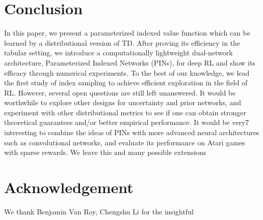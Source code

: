 \documentclass[letterpaper]{article} %
\theoremstyle{definition}
\begin{document}
\vspace{-0.95mm}
\vspace{-1.65mm}
\section{Conclusion}

In this paper, we present a parameterized indexed value function which can be learned by a distributional version of TD. After proving its efficiency in the tabular setting, we introduce a computationally lightweight dual-network architecture, Parameterized Indexed Networks (PINs), for deep RL and show its efficacy through numerical experiments. To the best of our knowledge, we lead the first study of index sampling to achieve efficient exploration in the field of RL.  However, several open questions are still left unanswered. It would be worthwhile to explore other designs for uncertainty and prior networks, and experiment with other distributional metrics to see if one can obtain stronger theoretical guarantees and/or better empirical performance. It would be very7 interesting to combine the ideas of PINs with more advanced neural architectures such as convolutional networks, and evaluate its performance on Atari games with sparse rewards. We leave this and many possible extensions

\vspace{-1.62mm}
\section{Acknowledgement}
We thank Benjamin Van Roy, Chengshu Li for the insightful

\medskip

\clearpage


\end{document}

